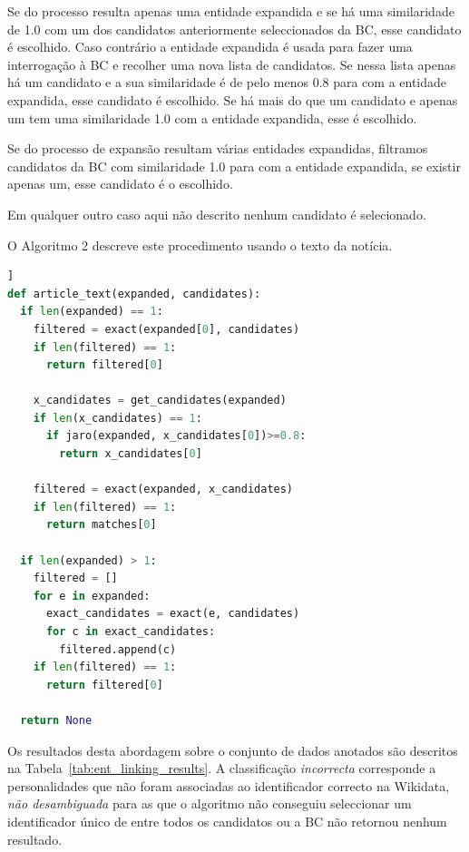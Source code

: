 \documentclass[a4paper, twocolumn, 11pt, twoside]{article}
\begin{document}
Se do processo resulta apenas uma entidade expandida e se há uma similaridade de 1.0 com um dos candidatos anteriormente seleccionados da BC, esse candidato é escolhido. Caso contrário a entidade expandida é usada para fazer uma interrogação à BC e recolher uma nova lista de candidatos. Se nessa lista apenas há um candidato e a sua similaridade é de pelo menos 0.8 para com a entidade expandida, esse candidato é escolhido. Se há mais do que um candidato e apenas um tem uma similaridade 1.0 com a entidade expandida, esse é escolhido. 

Se do processo de expansão resultam várias entidades expandidas, filtramos candidatos da BC com similaridade 1.0 para com a entidade expandida, se existir apenas um, esse candidato é o escolhido. 

Em qualquer outro caso aqui não descrito nenhum candidato é selecionado.

O Algoritmo 2 descreve este procedimento usando o texto da notícia.

\begin{lstlisting}[language=python,columns=fullflexible,frame=single,label={lst:alg2},title={Algoritmo 2. Ligação com a Wikidata usando o texto da notícia para expandir as entidades reconhecidas no título.},captionpos=b]]
def article_text(expanded, candidates):
  if len(expanded) == 1:
    filtered = exact(expanded[0], candidates)
	if len(filtered) == 1:
	  return filtered[0]
	  
    x_candidates = get_candidates(expanded)
    if len(x_candidates) == 1:
      if jaro(expanded, x_candidates[0])>=0.8:
        return x_candidates[0]
 
    filtered = exact(expanded, x_candidates)
    if len(filtered) == 1:
      return matches[0]
  
  if len(expanded) > 1:
    filtered = []
    for e in expanded:
      exact_candidates = exact(e, candidates)
	  for c in exact_candidates:
	    filtered.append(c)
    if len(filtered) == 1:
      return filtered[0]

  return None
\end{lstlisting}

Os resultados desta abordagem sobre o conjunto de dados anotados são descritos na Tabela~\ref{tab:ent_linking_results}. A classificação \textit{incorrecta} corresponde a personalidades que não foram associadas ao identificador correcto na Wikidata, \textit{não desambiguada} para as que o algoritmo não conseguiu seleccionar um identificador único de entre todos os candidatos ou a BC não retornou nenhum resultado.
\end{document}
